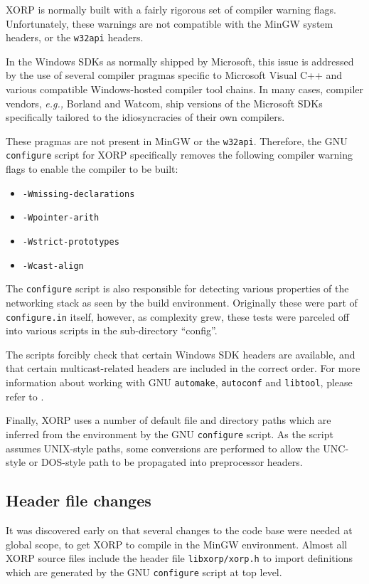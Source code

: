 \documentclass[11pt]{article}
\newcommand{\eg}{\emph{e.g.,}\xspace}
\begin{document}
XORP is normally built with a fairly rigorous set of compiler warning flags.
Unfortunately, these warnings are not compatible with the MinGW system headers,
or the {\tt w32api} headers.

In the Windows SDKs as normally shipped by Microsoft, this issue is addressed
by the use of several compiler pragmas specific to Microsoft Visual C++ and 
various compatible Windows-hosted compiler tool chains. In many cases,
compiler vendors, \eg Borland and Watcom, ship versions of the Microsoft SDKs
specifically tailored to the idiosyncracies of their own compilers.

These pragmas are not present in MinGW or the {\tt w32api}. Therefore, the GNU
{\tt configure} script for XORP specifically removes the following compiler
warning flags to enable the compiler to be built:
\begin{itemize}
 \item {\tt -Wmissing-declarations}
 \item {\tt -Wpointer-arith}
 \item {\tt -Wstrict-prototypes}
 \item {\tt -Wcast-align}
\end{itemize}

The {\tt configure} script is also responsible for detecting various properties
of the networking stack as seen by the build environment. Originally these
were part of {\tt configure.in} itself, however, as complexity grew, these tests
were parceled off into various scripts in the sub-directory ``config''.

The scripts forcibly check that certain Windows SDK headers are available, and
that certain multicast-related headers are included in the correct order.
For more information about working with GNU {\tt automake}, {\tt autoconf} and {\tt libtool},
please refer to \cite{goat:2000}.

Finally, XORP uses a number of default file and directory paths which are
inferred from the environment by the GNU {\tt configure} script. As the script
assumes UNIX-style paths, some conversions are performed to allow the
UNC-style or DOS-style path to be propagated into preprocessor headers.


\subsection{Header file changes}

It was discovered early on that several changes to the code
base were needed at global scope, to get XORP to compile in the MinGW environment.
Almost all XORP source files include the header file
{\tt libxorp/xorp.h} to import definitions which are generated by the GNU {\tt configure}
script at top level.
\end{document}

